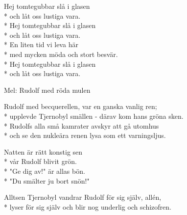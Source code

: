 \begin{SongText}
    \begin{SongVerse}
        Hej tomtegubbar slå i glasen\\*%
        och låt oss lustiga vara.\\*%
        Hej tomtegubbar slå i glasen\\*%
        och låt oss lustiga vara.\\*%
        En liten tid vi leva här\\*%
        med mycken möda och stort besvär.\\*%
        Hej tomtegubbar slå i glasen\\*%
        och låt oss lustiga vara.
    \end{SongVerse}
\end{SongText}
\begin{SongText}
    \begin{SongVerse}
        Mel: Rudolf med röda mulen
    \end{SongVerse}
    \begin{SongVerse}
        Rudolf med becquerellen, var en ganska vanlig ren;\\*%
        upplevde Tjernobyl smällen - därav kom hans gröna sken.\\*%
        Rudolfs alla små kamrater avskyr att gå utomhus\\*%
        och se den nukleära renen lysa som ett varningsljus.
    \end{SongVerse}
    \begin{SongVerse}
        Natten är rätt konstig sen\\*%
        vår Rudolf blivit grön.\\*%
        "Ge dig av!" är allas bön.\\*%
        "Du smälter ju bort snön!"
    \end{SongVerse}
    \begin{SongVerse}
        Alltsen Tjernobyl vandrar Rudolf för sig själv, allén,\\*%
        lyser för sig själv och blir nog underlig och schizofren.
    \end{SongVerse}
\end{SongText}
